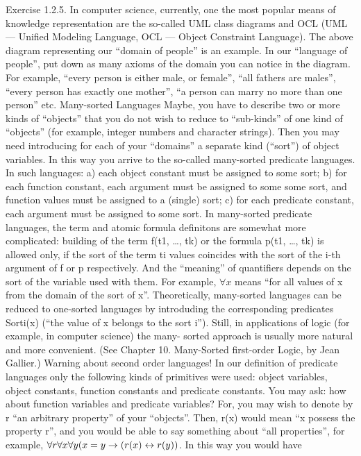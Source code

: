 Exercise 1.2.5. In computer science, currently, one the most popular means of knowledge representation are the so-called UML class diagrams and OCL (UML --- Unified Modeling Language, OCL --- Object Constraint Language). The above diagram representing our ``domain of people'' is an example. In our
``language of people'', put down as many axioms of the domain you can notice in the diagram. For example, ``every person is either male, or female'', ``all fathers are males'', ``every person has exactly one mother'', ``a person can marry no more than one person'' etc.  Many-sorted Languages
Maybe, you have to describe two or more kinds of ``objects'' that you do not wish to reduce to ``sub-kinds'' of one kind of ``objects'' (for example, integer numbers and character strings). Then you may need introducing for each of your ``domains'' a separate kind (``sort'') of object variables. In this way you arrive to the so-called many-sorted predicate languages. In such
languages: a) each object constant must be assigned to some sort; b) for each function constant, each argument must be
assigned to some some sort, and function values must be assigned to a (single) sort; c) for each predicate constant, each
argument must be assigned to some sort. In many-sorted predicate languages, the term and atomic formula definitons are
somewhat more complicated: building of the term f(t1, \ldots , tk) or the formula p(t1, \ldots , tk) is allowed only, if the sort of the term ti
values coincides with the sort of the i-th argument of f or p respectively. And the ``meaning'' of quantifiers depends on the sort
of the variable used with them. For example, \(\forall x\) means ``for all values of x from the domain of the sort of x''.
Theoretically, many-sorted languages can be reduced to one-sorted languages by introduding the corresponding predicates
Sorti(x) (``the value of x belongs to the sort i''). Still, in applications of logic (for example, in computer science) the many-
sorted approach is usually more natural and more convenient. (See Chapter 10. Many-Sorted first-order Logic, by Jean
Gallier.)
Warning about second order languages!
In our definition of predicate languages only the following kinds of primitives were used: object variables, object constants,
function constants and predicate constants. You may ask: how about function variables and predicate variables? For, you
may wish to denote by r ``an arbitrary property'' of your ``objects''. Then, r(x) would mean ``x possess the property r'', and you
would be able to say something about ``all properties'', for example, \(\forall r\forall x \forall y(x=y\rightarrow (r(x)\leftrightarrow r(y))\). In this way you would have

